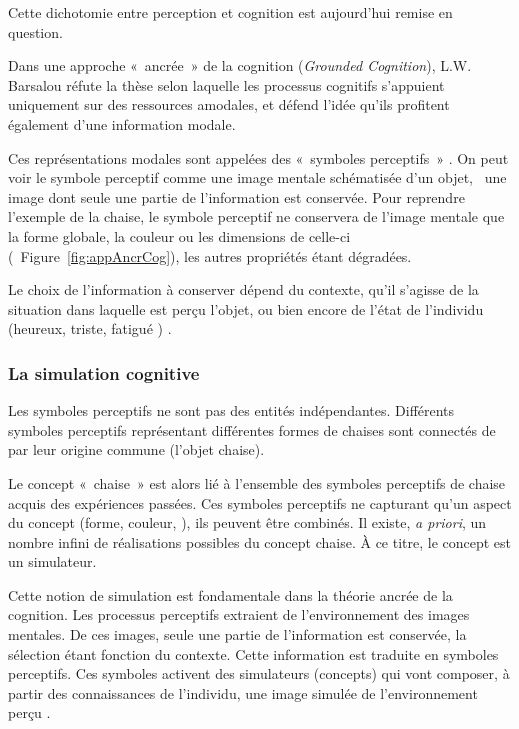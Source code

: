 Cette dichotomie entre perception et cognition est aujourd'hui remise en question. 

Dans une approche «~ancrée~» de la cognition (\emph{Grounded Cognition}), L.W. Barsalou réfute la thèse selon laquelle les processus cognitifs s'appuient uniquement sur des ressources amodales, et défend l'idée qu'ils profitent également d'une information modale.

Ces représentations modales sont appelées des «~symboles perceptifs~» \citep{barsalou1999perceptions}. On peut voir le symbole perceptif comme une image mentale schématisée d'un objet, \ie~une image dont seule une partie de l'information est conservée. Pour reprendre l'exemple de la chaise, le symbole perceptif ne conservera de l'image mentale que la forme globale, la couleur ou les dimensions de celle-ci (\cf~Figure~\ref{fig:appAncrCog}), les autres propriétés étant dégradées. 

Le choix de l'information à conserver dépend du contexte, qu'il s'agisse de la situation dans laquelle est perçu l'objet, ou bien encore de l'état de l'individu (heureux, triste, fatigué \etc) \citep{barsalou2003situated}.

\subsubsection{La simulation cognitive}

Les symboles perceptifs ne sont pas des entités indépendantes. Différents symboles perceptifs représentant différentes formes de chaises sont connectés de par leur origine commune (l'objet chaise).
 
Le concept «~chaise~» est alors lié à l'ensemble des symboles perceptifs de chaise acquis des expériences passées. Ces symboles perceptifs ne capturant qu'un aspect du concept (forme, couleur, \etc), ils peuvent être combinés. Il existe, \emph{a priori}, un nombre infini de réalisations possibles du concept chaise. À ce titre, le concept est un simulateur.

Cette notion de simulation est fondamentale dans la théorie ancrée de la cognition. Les processus perceptifs extraient de l'environnement des images mentales. De ces images, seule une partie de l'information est conservée, la sélection étant fonction du contexte. Cette information est traduite en symboles perceptifs. Ces symboles activent des simulateurs (concepts) qui vont composer, à partir des connaissances de l'individu, une image simulée de l'environnement perçu \citep{barsalou2003situated}.

